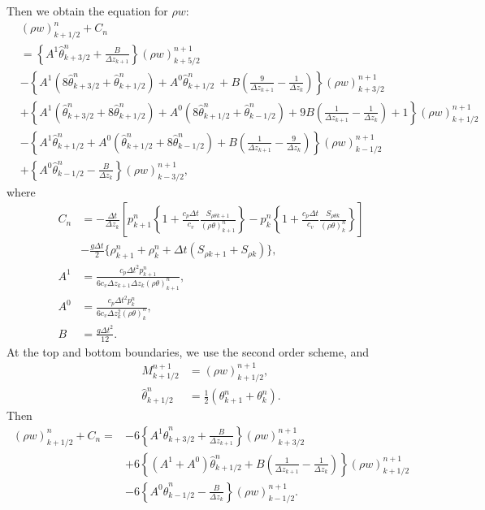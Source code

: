 Then we obtain the equation for $\rho w$:
\begin{align}
  & (\rho w)_{k+1/2}^n + C_n \\
  &= \left\{A^1\hat\theta_{k+3/2}^n + \frac{B}{\Delta z_{k+1}}\right\} (\rho w)_{k+5/2}^{n+1} \nonumber \\
  &- \left\{A^1(8\hat\theta_{k+3/2}^n+\hat\theta_{k+1/2}^n) + A^0\hat\theta_{k+1/2}^n\ + B\left(\frac{9}{\Delta z_{k+1}}-\frac{1}{\Delta z_k}\right)\right\} (\rho w)_{k+3/2}^{n+1} \nonumber \\
  &+ \left\{A^1(\hat\theta_{k+3/2}^n+8\hat\theta_{k+1/2}^n) + A^0(8\hat\theta_{k+1/2}^n+\hat\theta_{k-1/2}^n) + 9B\left(\frac{1}{\Delta z_{k+1}}-\frac{1}{\Delta z_k}\right) + 1\right\} (\rho w)_{k+1/2}^{n+1} \nonumber \\
  &- \left\{A^1\hat\theta_{k+1/2}^n + A^0(\hat\theta_{k+1/2}^n+8\hat\theta_{k-1/2}^n) + B\left(\frac{1}{\Delta z_{k+1}}-\frac{9}{\Delta z_k}\right)\right\} (\rho w)_{k-1/2}^{n+1} \nonumber \\
  &+ \left\{A^0\hat\theta_{k-1/2}^n - \frac{B}{\Delta z_k}\right\} (\rho w)_{k-3/2}^{n+1},
\end{align}
where
\begin{align}
  C_n
  &= -\frac{\Delta t}{\Delta z_k}\left[
    p_{k+1}^n\left\{1+\frac{c_p\Delta t}{c_v}\frac{S_{\rho\theta k+1}}{(\rho\theta)_{k+1}^n}\right\}
  - p_k^n   \left\{1+\frac{c_p\Delta t}{c_v}\frac{S_{\rho\theta k}  }{(\rho\theta)_k^n   }\right\}
    \right] \nonumber \\
  &-\frac{g\Delta t}{2}\{\rho_{k+1}^n+\rho_k^n+\Delta t(S_{\rho k+1}+S_{\rho k})\}, \\
  A^1 &= \frac{c_p\Delta t^2 p_{k+1}^n}{6c_v\Delta z_{k+1}\Delta z_k(\rho\theta)_{k+1}^n}, \\
  A^0 &= \frac{c_p\Delta t^2 p_k^n   }{6c_v\Delta z_k^2           (\rho\theta)_k^n}, \\
  B &= \frac{g\Delta t^2}{12}.
\end{align}
At the top and bottom boundaries,
we use the second order scheme,
and
\begin{align}
  M_{k+1/2}^{n+1} &= (\rho w)_{k+1/2}^{n+1}, \\
  \hat\theta_{k+1/2}^n &= \frac{1}{2}(\theta_{k+1}^n+\theta_k^n).
\end{align}
Then
\begin{align}
  (\rho w)_{k+1/2}^n + C_n =
  &- 6\left\{A^1\hat\theta_{k+3/2}^n + \frac{B}{\Delta z_{k+1}}\right\} (\rho w)_{k+3/2}^{n+1} \nonumber \\
  &+ 6\left\{(A^1+A^0)\hat\theta_{k+1/2}^n + B\left(\frac{1}{\Delta z_{k+1}}-\frac{1}{\Delta z_k}\right)\right\} (\rho w)_{k+1/2}^{n+1} \nonumber \\
  &- 6\left\{A^0\hat\theta_{k-1/2}^n - \frac{B}{\Delta z_k}\right\} (\rho w)_{k-1/2}^{n+1}.
\end{align}


